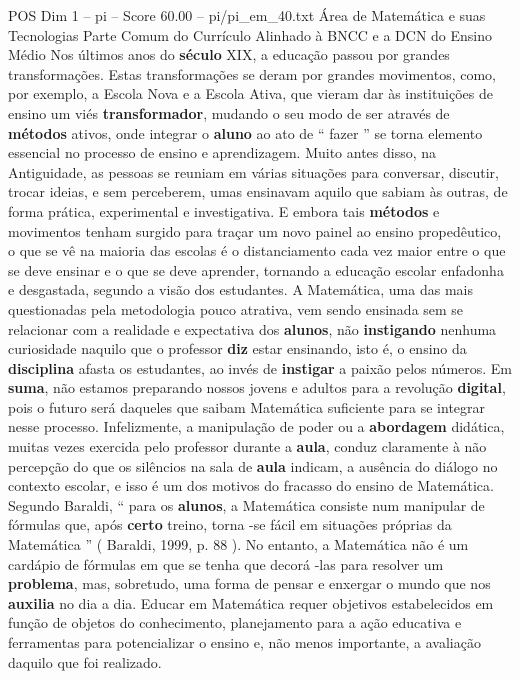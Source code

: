 \begin{textsample}{POS Dim 1 – pi – Score 60.00 – pi/pi\_em\_40.txt}  \label{ex:f1_pos_054}
Área de Matemática e suas Tecnologias Parte Comum do Currículo Alinhado à BNCC e a DCN do Ensino Médio Nos últimos anos do \textbf{século} XIX, a educação passou por grandes transformações.
Estas transformações se deram por grandes movimentos, como, por exemplo, a Escola Nova e a Escola Ativa, que vieram dar às instituições de ensino um viés \textbf{transformador}, mudando o seu modo de ser através de \textbf{métodos} ativos, onde integrar o \textbf{aluno} ao ato de “ fazer ” se torna elemento essencial no processo de ensino e aprendizagem.
Muito antes disso, na Antiguidade, as pessoas se reuniam em várias situações para conversar, discutir, trocar ideias, e sem perceberem, umas ensinavam aquilo que sabiam às outras, de forma prática, experimental e investigativa.
E embora tais \textbf{métodos} e movimentos tenham surgido para traçar um novo painel ao ensino propedêutico, o que se vê na maioria das escolas é o distanciamento cada vez maior entre o que se deve ensinar e o que se deve aprender, tornando a educação escolar enfadonha e desgastada, segundo a visão dos estudantes.
A Matemática, uma das mais questionadas pela metodologia pouco atrativa, vem sendo ensinada sem se relacionar com a realidade e expectativa dos \textbf{alunos}, não \textbf{instigando} nenhuma curiosidade naquilo que o professor \textbf{diz} estar ensinando, isto é, o ensino da \textbf{disciplina} afasta os estudantes, ao invés de \textbf{instigar} a paixão pelos números.
Em \textbf{suma}, não estamos preparando nossos jovens e adultos para a revolução \textbf{digital}, pois o futuro será daqueles que saibam Matemática suficiente para se integrar nesse processo.
Infelizmente, a manipulação de poder ou a \textbf{abordagem} didática, muitas vezes exercida pelo professor durante a \textbf{aula}, conduz claramente à não percepção do que os silêncios na sala de \textbf{aula} indicam, a ausência do diálogo no contexto escolar, e isso é um dos motivos do fracasso do ensino de Matemática.
Segundo Baraldi, “ para os \textbf{alunos}, a Matemática consiste num manipular de fórmulas que, após \textbf{certo} treino, torna -se fácil em situações próprias da Matemática ” ( Baraldi, 1999, p. 88 ).
No entanto, a Matemática não é um cardápio de fórmulas em que se tenha que decorá -las para resolver um \textbf{problema}, mas, sobretudo, uma forma de pensar e enxergar o mundo que nos \textbf{auxilia} no dia a dia.
Educar em Matemática requer objetivos estabelecidos em função de objetos do conhecimento, planejamento para a ação educativa e ferramentas para potencializar o ensino e, não menos importante, a avaliação daquilo que foi realizado.

\end{textsample}
